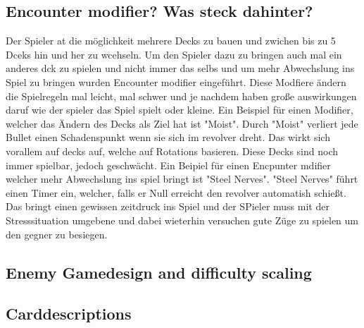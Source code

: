 \subsection{Encounter modifier? Was steck dahinter?}\label{subsec:placementMatters}

Der Spieler at die möglichkeit mehrere Decks zu bauen und zwichen bis zu 5 Dceks hin und her zu wcehseln.
Um den Spieler dazu zu bringen auch mal ein anderes dck zu spielen und nicht immer das selbs und um mehr
Abwechslung ins Spiel zu bringen wurden Encounter modifier eingeführt.
Diese Modfiere ändern die Spielregeln mal leicht, mal schwer und je nachdem haben große auswirkungen daruf wie der spieler das Spiel spielt oder kleine.
Ein Beispiel für einen Modifier, welcher das Ändern des Decks als Ziel hat ist "Moist". Durch "Moist" verliert jede Bullet einen Schadenspunkt wenn sie sich im revolver dreht.
Das wirkt sich vorallem auf decks auf, welche auf Rotations basieren. Diese Decks sind noch immer spielbar, jedoch geschwächt.
Ein Beipiel für einen Encpunter mdifier welcher mehr Abwechslung ins spiel bringt ist "Steel Nerves". "Steel Nerves" führt
einen Timer ein, welcher, falls er Null erreicht den revolver automatish schießt. Das bringt einen gewissen zeitdruck
ins Spiel und der SPieler muss mit der Stresssituation umgebene und dabei wieterhin versuchen gute Züge zu spielen um den gegner zu besiegen. %

\subsection{Enemy Gamedesign and difficulty scaling}\label{subsec:placementMatters}







\subsection{Carddescriptions}\label{subsec:placementMatters}

